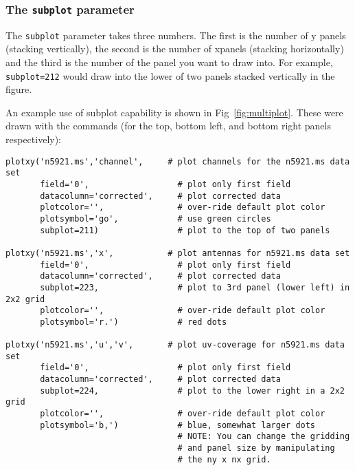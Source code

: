\subsubsection{ The {\tt subplot} parameter }
\label{section:edit.plot.plotxy.subplot}

The {\tt subplot} parameter takes three
numbers. The first is the number of y panels (stacking vertically),
the second is the number of xpanels (stacking horizontally) and the
third is the number of the panel you want to draw into. For example,
{\tt subplot=212} would draw into the lower of two
panels stacked vertically in the figure.

An example use of subplot capability is shown in
Fig~\ref{fig:multiplot}.  These were drawn with the commands (for the
top, bottom left, and bottom right panels respectively):
\small
\begin{verbatim}
plotxy('n5921.ms','channel',     # plot channels for the n5921.ms data set
       field='0',                  # plot only first field
       datacolumn='corrected',     # plot corrected data
       plotcolor='',               # over-ride default plot color
       plotsymbol='go',            # use green circles
       subplot=211)                # plot to the top of two panels

plotxy('n5921.ms','x',           # plot antennas for n5921.ms data set
       field='0',                  # plot only first field
       datacolumn='corrected',     # plot corrected data
       subplot=223,                # plot to 3rd panel (lower left) in 2x2 grid
       plotcolor='',               # over-ride default plot color
       plotsymbol='r.')            # red dots

plotxy('n5921.ms','u','v',       # plot uv-coverage for n5921.ms data set
       field='0',                  # plot only first field
       datacolumn='corrected',     # plot corrected data
       subplot=224,                # plot to the lower right in a 2x2 grid
       plotcolor='',               # over-ride default plot color
       plotsymbol='b,')            # blue, somewhat larger dots
                                   # NOTE: You can change the gridding
                                   # and panel size by manipulating
                                   # the ny x nx grid.

\end{verbatim}
\normalsize

